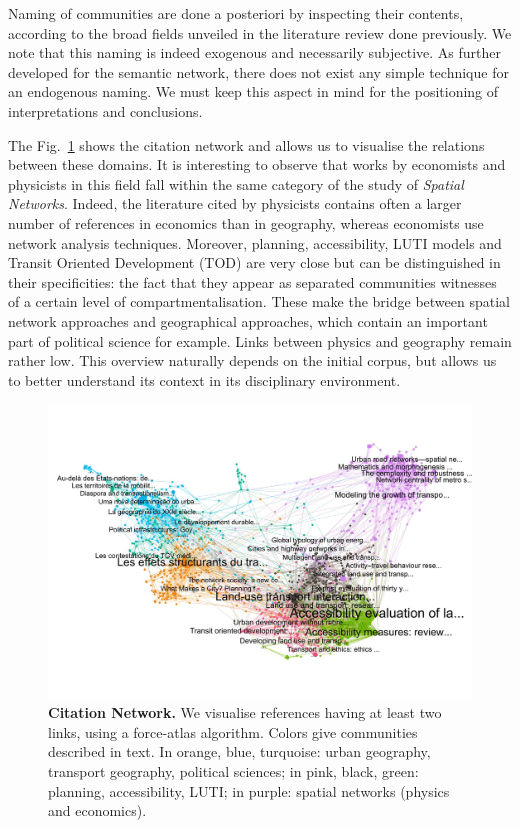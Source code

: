 \documentclass[10pt]{article}
\begin{document}
Naming of communities are done a posteriori by inspecting their contents, according to the broad fields unveiled in the literature review done previously. We note that this naming is indeed exogenous and necessarily subjective. As further developed for the semantic network, there does not exist any simple technique for an endogenous naming. We must keep this aspect in mind for the positioning of interpretations and conclusions.

The Fig.~\ref{fig:citnw} shows the citation network and allows us to visualise the relations between these domains. It is interesting to observe that works by economists and physicists in this field fall within the same category of the study of \emph{Spatial Networks}. Indeed, the literature cited by physicists contains often a larger number of references in economics than in geography, whereas economists use network analysis techniques. Moreover, planning, accessibility, LUTI models and Transit Oriented Development (TOD) are very close but can be distinguished in their specificities: the fact that they appear as separated communities witnesses of a certain level of compartmentalisation. These make the bridge between spatial network approaches and geographical approaches, which contain an important part of political science for example. Links between physics and geography remain rather low. This overview naturally depends on the initial corpus, but allows us to better understand its context in its disciplinary environment.

\begin{figure}[!ht]
\includegraphics[width=\linewidth]{figures/2-2-2-fig-quantepistemo-citnw.jpg}
\caption{\textbf{Citation Network.} We visualise references having at least two links, using a force-atlas algorithm. Colors give communities described in text. In orange, blue, turquoise: urban geography, transport geography, political sciences; in pink, black, green: planning, accessibility, LUTI; in purple: spatial networks (physics and economics).\label{fig:citnw}}
\end{figure}
\end{document}
